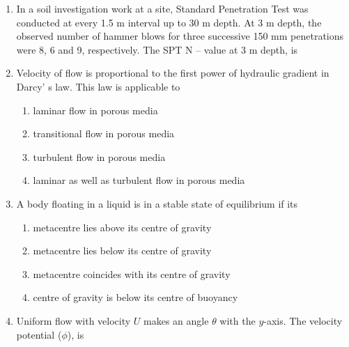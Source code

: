 \documentclass[journal]{IEEEtran}
\begin{document}
\begin{enumerate}
\begin{enumerate}
\end{enumerate}

\item In a soil investigation work at a site, Standard Penetration Test  was conducted at every 1.5 m interval up to 30 m depth. At 3 m depth, the observed number of hammer blows for three successive 150 mm penetrations were 8, 6 and 9, respectively. The SPT N -- value at 3 m depth, is \hfill {}

\begin{enumerate}
\end{enumerate}

\item Velocity of flow is proportional to the first power of hydraulic gradient in Darcy' s law. This law is applicable to \hfill {}

\begin{enumerate}

\item laminar flow in porous media
\item transitional flow in porous media
\item turbulent flow in porous media
\item laminar as well as turbulent flow in porous media

\end{enumerate}

\item A body floating in a liquid is in a stable state of equilibrium if its  \hfill {}

\begin{enumerate}

\item metacentre lies above its centre of gravity
\item metacentre lies below its centre of gravity
\item metacentre coincides with its centre of gravity
\item centre of gravity is below its centre of buoyancy

\end{enumerate}

\item Uniform flow with velocity $U$ makes an angle $\theta$ with the $y$-axis. The velocity potential ($\phi$), is  \hfill {}


\end{enumerate}
\end{document}
